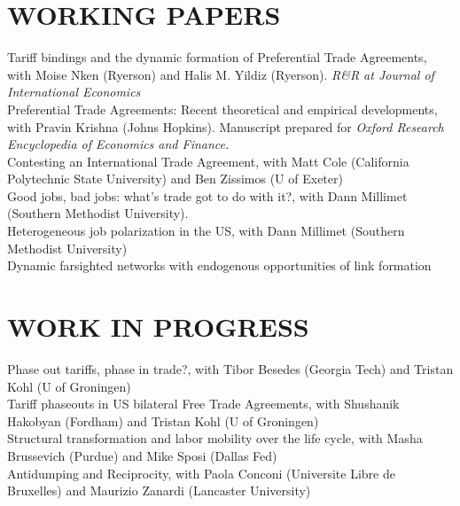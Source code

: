 \documentclass[11pt]{res}
\begin{document}
\begin{resume}
\section{WORKING PAPERS}\vspace{1.5mm}
{Tariff bindings and the dynamic formation of Preferential Trade Agreements}, with Moise Nken (Ryerson) and Halis M. Yildiz (Ryerson). \emph{R\&R at Journal of International Economics}\vspace{1.5mm}\\
{Preferential Trade Agreements: Recent theoretical and empirical developments}, with Pravin Krishna (Johns Hopkins). Manuscript prepared for \emph{Oxford Research Encyclopedia of Economics and Finance.}\vspace{1.5mm}\\
{Contesting an International Trade Agreement}, with Matt Cole (California Polytechnic State University) and Ben Zissimos (U of Exeter) \vspace{1.5mm}\\
{Good jobs, bad jobs: what's trade got to do with it?}, with Dann Millimet (Southern Methodist University).\vspace{1.5mm}\\
{Heterogeneous job polarization in the US}, with Dann Millimet (Southern Methodist University)\vspace{1.5mm}\\
{Dynamic farsighted networks with endogenous opportunities of link formation}

\section{WORK IN PROGRESS}\vspace{1.5mm}
Phase out tariffs, phase in trade?, with Tibor Besedes (Georgia Tech) and Tristan Kohl (U of Groningen) \vspace{1.5mm}\\
Tariff phaseouts in US bilateral Free Trade Agreements, with Shushanik Hakobyan (Fordham) and Tristan Kohl (U of Groningen)\vspace{1.5mm}\\
Structural transformation and labor mobility over the life cycle, with Masha Brussevich (Purdue) and Mike Sposi (Dallas Fed)\vspace{1.5mm}\\
Antidumping and Reciprocity, with Paola Conconi (Universite Libre de Bruxelles) and Maurizio Zanardi (Lancaster University)


\end{resume}
\end{document}
